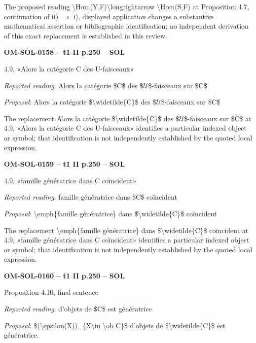 The proposed reading \textbackslash{}Hom(Y,F)\textbackslash{}longrightarrow \textbackslash{}Hom(S,F) at Proposition 4.7, continuation of ii) \ensuremath{\Rightarrow} i), displayed application changes a substantive mathematical assertion or bibliographic identification; no independent derivation of this exact replacement is established in this review.\par
\par\noindent\textbf{OM-SOL-0158 -- t1 II p.250 -- SOL}\par
4.9, «Alors la catégorie C des U-faisceaux»\par
\emph{Reported reading}: Alors la catégorie \$C\$ des \$\ensuremath{𝒰}\$-faisceaux sur \$C\$\par
\emph{Proposal}: Alors la catégorie \$\textbackslash{}widetilde\{C\}\$ des \$\ensuremath{𝒰}\$-faisceaux sur \$C\$\par
The replacement Alors la catégorie \$\textbackslash{}widetilde\{C\}\$ des \$\ensuremath{𝒰}\$-faisceaux sur \$C\$ at 4.9, «Alors la catégorie C des U-faisceaux» identifies a particular indexed object or symbol; that identification is not independently established by the quoted local expression.\par
\par\noindent\textbf{OM-SOL-0159 -- t1 II p.250 -- SOL}\par
4.9, «famille génératrice dans C coïncident»\par
\emph{Reported reading}: famille génératrice dans \$C\$ coïncident\par
\emph{Proposal}: \textbackslash{}emph\{famille génératrice\} dans \$\textbackslash{}widetilde\{C\}\$ coïncident\par
The replacement \textbackslash{}emph\{famille génératrice\} dans \$\textbackslash{}widetilde\{C\}\$ coïncident at 4.9, «famille génératrice dans C coïncident» identifies a particular indexed object or symbol; that identification is not independently established by the quoted local expression.\par
\par\noindent\textbf{OM-SOL-0160 -- t1 II p.250 -- SOL}\par
Proposition 4.10, final sentence\par
\emph{Reported reading}: d'objets de \$C\$ est génératrice\par
\emph{Proposal}: \$(\textbackslash{}epsilon(X))\_\{X\textbackslash{}in \textbackslash{}ob C\}\$ d'objets de \$\textbackslash{}widetilde\{C\}\$ est génératrice.\par
